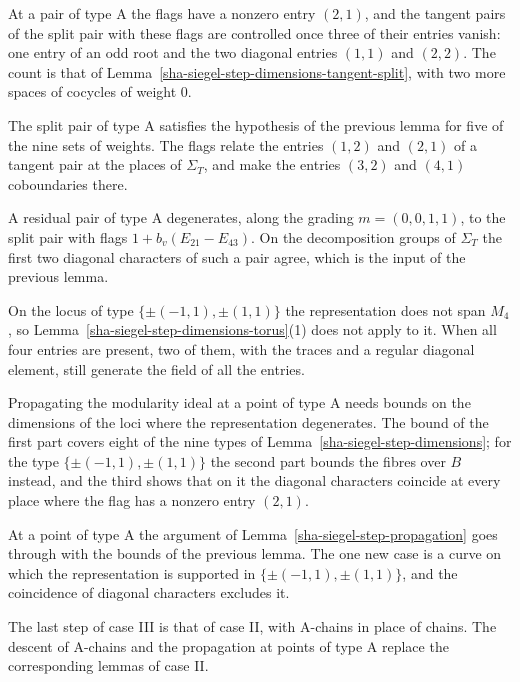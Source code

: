 At a pair of type A the flags have a nonzero entry $(2,1)$, and the tangent pairs of the split pair with these flags are controlled once three of their entries vanish: one entry of an odd root and the two diagonal entries $(1,1)$ and $(2,2)$. The count is that of Lemma~\ref{sha-siegel-step-dimensions-tangent-split}, with two more spaces of cocycles of weight $0$.

The split pair of type A satisfies the hypothesis of the previous lemma for five of the nine sets of weights. The flags relate the entries $(1,2)$ and $(2,1)$ of a tangent pair at the places of $\Sigma_T$, and make the entries $(3,2)$ and $(4,1)$ coboundaries there.

A residual pair of type A degenerates, along the grading $m=(0,0,1,1)$, to the split pair with flags $1+b_v(E_{21}-E_{43})$. On the decomposition groups of $\Sigma_T$ the first two diagonal characters of such a pair agree, which is the input of the previous lemma.

On the locus of type $\{\pm(-1,1),\pm(1,1)\}$ the representation does not span $M_4$, so Lemma~\ref{sha-siegel-step-dimensions-torus}(1) does not apply to it. When all four entries are present, two of them, with the traces and a regular diagonal element, still generate the field of all the entries.

Propagating the modularity ideal at a point of type A needs bounds on the dimensions of the loci where the representation degenerates. The bound of the first part covers eight of the nine types of Lemma~\ref{sha-siegel-step-dimensions}; for the type $\{\pm(-1,1),\pm(1,1)\}$ the second part bounds the fibres over $B$ instead, and the third shows that on it the diagonal characters coincide at every place where the flag has a nonzero entry $(2,1)$.

At a point of type A the argument of Lemma~\ref{sha-siegel-step-propagation} goes through with the bounds of the previous lemma. The one new case is a curve on which the representation is supported in $\{\pm(-1,1),\pm(1,1)\}$, and the coincidence of diagonal characters excludes it.

The last step of case III is that of case II, with A-chains in place of chains. The descent of A-chains and the propagation at points of type A replace the corresponding lemmas of case II.


